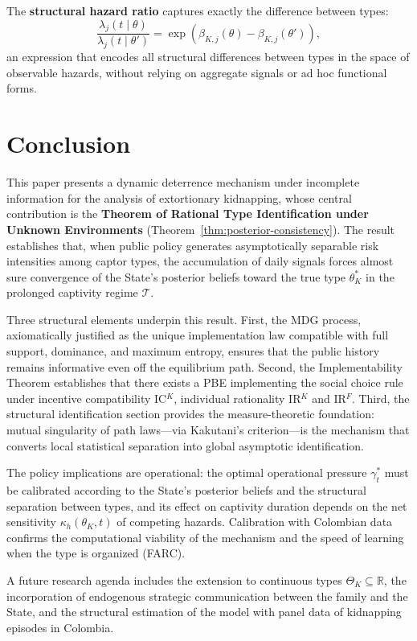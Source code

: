 \documentclass[12pt]{article}
\theoremstyle{definition}
\theoremstyle{remark}
\newcommand{\1}{\mathbf{1}}
\begin{document}
The \textbf{structural hazard ratio} captures exactly the difference between types:
\[
\frac{\lambda_j(t \mid \theta)}{\lambda_j(t \mid \theta')} = \exp\!\left( \beta_{K,j}(\theta) - \beta_{K,j}(\theta') \right),
\]
an expression that encodes all structural differences between types in the space of observable hazards, without relying on aggregate signals or ad hoc functional forms.

\section{Conclusion}
\label{sec:conclusion}

\noindent This paper presents a dynamic deterrence mechanism under incomplete information for the analysis of extortionary kidnapping, whose central contribution is the \textbf{Theorem of Rational Type Identification under Unknown Environments} (Theorem~\ref{thm:posterior-consistency}). The result establishes that, when public policy generates asymptotically separable risk intensities among captor types, the accumulation of daily signals forces almost sure convergence of the State's posterior beliefs toward the true type $\theta_K^\ast$ in the prolonged captivity regime $\mathcal{T}$.

Three structural elements underpin this result. First, the MDG process, axiomatically justified as the unique implementation law compatible with full support, dominance, and maximum entropy, ensures that the public history remains informative even off the equilibrium path. Second, the Implementability Theorem establishes that there exists a PBE implementing the social choice rule under incentive compatibility IC$^K$, individual rationality IR$^K$ and IR$^F$. Third, the structural identification section provides the measure-theoretic foundation: mutual singularity of path laws---via Kakutani's criterion---is the mechanism that converts local statistical separation into global asymptotic identification.

The policy implications are operational: the optimal operational pressure $\gamma_t^\ast$ must be calibrated according to the State's posterior beliefs and the structural separation between types, and its effect on captivity duration depends on the net sensitivity $\kappa_h(\theta_K,t)$ of competing hazards. Calibration with Colombian data confirms the computational viability of the mechanism and the speed of learning when the type is organized (FARC).

A future research agenda includes the extension to continuous types $\Theta_K\subseteq\mathbb{R}$, the incorporation of endogenous strategic communication between the family and the State, and the structural estimation of the model with panel data of kidnapping episodes in Colombia.

\printbibliography[title={References}]
\end{document}
